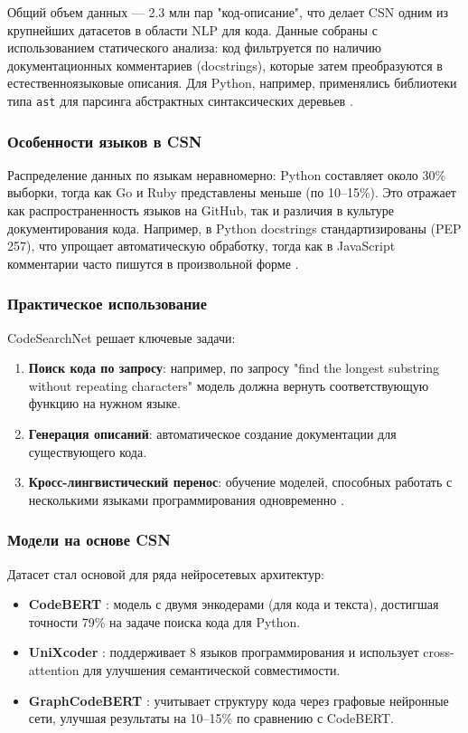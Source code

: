 \documentclass[14pt]{article}
\theoremstyle{definition}
\begin{document}
Общий объем данных — 2.3 млн пар "код-описание", что делает CSN одним из крупнейших датасетов в области NLP для кода. Данные собраны с использованием статического анализа: код фильтруется по наличию документационных комментариев (docstrings), которые затем преобразуются в естественноязыковые описания. Для Python, например, применялись библиотеки типа \texttt{ast} для парсинга абстрактных синтаксических деревьев \cite{allamanis2019adverse}.

\subsubsection{Особенности языков в CSN}
Распределение данных по языкам неравномерно: Python составляет около 30\% выборки, тогда как Go и Ruby представлены меньше (по 10–15\%). Это отражает как распространенность языков на GitHub, так и различия в культуре документирования кода. Например, в Python docstrings стандартизированы (PEP 257), что упрощает автоматическую обработку, тогда как в JavaScript комментарии часто пишутся в произвольной форме \cite{zhang2020retrieval}.

\subsubsection{Практическое использование}
CodeSearchNet решает ключевые задачи:
\begin{enumerate}
    \item \textbf{Поиск кода по запросу}: например, по запросу "find the longest substring without repeating characters" модель должна вернуть соответствующую функцию на нужном языке.
    \item \textbf{Генерация описаний}: автоматическое создание документации для существующего кода.
    \item \textbf{Кросс-лингвистический перенос}: обучение моделей, способных работать с несколькими языками программирования одновременно \cite{guo2022unixcoder}.
\end{enumerate}

\subsubsection{Модели на основе CSN}
Датасет стал основой для ряда нейросетевых архитектур:
\begin{itemize}
    \item \textbf{CodeBERT} \cite{feng2020codebert}: модель с двумя энкодерами (для кода и текста), достигшая точности 79\% на задаче поиска кода для Python.
    \item \textbf{UniXcoder} \cite{guo2022unixcoder}: поддерживает 8 языков программирования и использует cross-attention для улучшения семантической совместимости.
    \item \textbf{GraphCodeBERT} \cite{guo2021graphcodebert}: учитывает структуру кода через графовые нейронные сети, улучшая результаты на 10–15\% по сравнению с CodeBERT.
\end{itemize}
\end{document}
